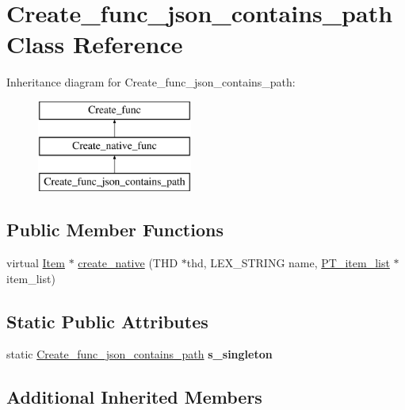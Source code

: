 \hypertarget{classCreate__func__json__contains__path}{}\section{Create\+\_\+func\+\_\+json\+\_\+contains\+\_\+path Class Reference}
\label{classCreate__func__json__contains__path}
Inheritance diagram for Create\+\_\+func\+\_\+json\+\_\+contains\+\_\+path\+:\begin{figure}[H]
\begin{center}
\leavevmode
\includegraphics[height=3.000000cm]{classCreate__func__json__contains__path}
\end{center}
\end{figure}
\subsection*{Public Member Functions}
\begin{DoxyCompactItemize}
\item 
virtual \mbox{\hyperlink{classItem}{Item}} $\ast$ \mbox{\hyperlink{classCreate__func__json__contains__path_a3e06c9e6e3e5b7d375141ff8e33082cd}{create\+\_\+native}} (T\+HD $\ast$thd, L\+E\+X\+\_\+\+S\+T\+R\+I\+NG name, \mbox{\hyperlink{classPT__item__list}{P\+T\+\_\+item\+\_\+list}} $\ast$item\+\_\+list)
\end{DoxyCompactItemize}
\subsection*{Static Public Attributes}
\begin{DoxyCompactItemize}
\item 
\mbox{\label{classCreate__func__json__contains__path_a7720d3d0096ae897fee1765808de552f}} 
static \mbox{\hyperlink{classCreate__func__json__contains__path}{Create\+\_\+func\+\_\+json\+\_\+contains\+\_\+path}} {\bfseries s\+\_\+singleton}
\end{DoxyCompactItemize}
\subsection*{Additional Inherited Members}


